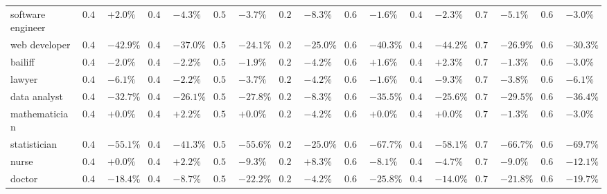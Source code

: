 \begin{table*}[ht]
{{\begin{tabular}{l|ll|ll|ll|ll|ll|ll|ll|ll}
\cellcolor{eecs!50} software engineer & $ 0.49 $ & $ +2.0\% $ & $ 0.46 $ & \cellcolor{red!16} $ -4.3\% $ & $ 0.54 $ & $ -3.7\% $ & $ 0.24 $ & $ -8.3\% $ & $ 0.62 $ & $ -1.6\% $ & $ 0.43 $ & $ -2.3\% $ & $ 0.78 $ & $ -5.1\% $ & $ 0.66 $ & $ -3.0\% $ \\
\cellcolor{eecs!50} web developer & $ 0.49 $ & $ -42.9\% $ & $ 0.46 $ & \cellcolor{red!36} $ -37.0\% $ & $ 0.54 $ & $ -24.1\% $ & $ 0.24 $ & $ -25.0\% $ & $ 0.62 $ & $ -40.3\% $ & $ 0.43 $ & $ -44.2\% $ & $ 0.78 $ & $ -26.9\% $ & $ 0.66 $ & $ -30.3\% $ \\
\midrule
\cellcolor{law!50} bailiff & $ 0.49 $ & $ -2.0\% $ & $ 0.46 $ & $ -2.2\% $ & $ 0.54 $ & \cellcolor{red!10} $ -1.9\% $ & $ 0.24 $ & $ -4.2\% $ & $ 0.62 $ & $ +1.6\% $ & $ 0.43 $ & $ +2.3\% $ & $ 0.78 $ & $ -1.3\% $ & $ 0.66 $ & $ -3.0\% $ \\
\cellcolor{law!50} lawyer & $ 0.49 $ & $ -6.1\% $ & $ 0.46 $ & $ -2.2\% $ & $ 0.54 $ & \cellcolor{red!15} $ -3.7\% $ & $ 0.24 $ & $ -4.2\% $ & $ 0.62 $ & $ -1.6\% $ & $ 0.43 $ & $ -9.3\% $ & $ 0.78 $ & $ -3.8\% $ & $ 0.66 $ & $ -6.1\% $ \\
\midrule
\cellcolor{math!50} data analyst & $ 0.49 $ & $ -32.7\% $ & $ 0.46 $ & $ -26.1\% $ & $ 0.54 $ & $ -27.8\% $ & $ 0.24 $ & \cellcolor{red!22} $ -8.3\% $ & $ 0.62 $ & $ -35.5\% $ & $ 0.43 $ & $ -25.6\% $ & $ 0.78 $ & $ -29.5\% $ & $ 0.66 $ & $ -36.4\% $ \\
\cellcolor{math!50} mathematician & $ 0.49 $ & $ +0.0\% $ & $ 0.46 $ & $ +2.2\% $ & $ 0.54 $ & $ +0.0\% $ & $ 0.24 $ & \cellcolor{red!16} $ -4.2\% $ & $ 0.62 $ & $ +0.0\% $ & $ 0.43 $ & $ +0.0\% $ & $ 0.78 $ & $ -1.3\% $ & $ 0.66 $ & $ -3.0\% $ \\
\cellcolor{math!50} statistician & $ 0.49 $ & $ -55.1\% $ & $ 0.46 $ & $ -41.3\% $ & $ 0.54 $ & $ -55.6\% $ & $ 0.24 $ & \cellcolor{red!32} $ -25.0\% $ & $ 0.62 $ & $ -67.7\% $ & $ 0.43 $ & $ -58.1\% $ & $ 0.78 $ & $ -66.7\% $ & $ 0.66 $ & $ -69.7\% $ \\
\midrule
\cellcolor{medicine!50} nurse & $ 0.49 $ & $ +0.0\% $ & $ 0.46 $ & $ +2.2\% $ & $ 0.54 $ & $ -9.3\% $ & $ 0.24 $ & $ +8.3\% $ & $ 0.62 $ & \cellcolor{red!22} $ -8.1\% $ & $ 0.43 $ & $ -4.7\% $ & $ 0.78 $ & $ -9.0\% $ & $ 0.66 $ & $ -12.1\% $ \\
\cellcolor{medicine!50} doctor & $ 0.49 $ & $ -18.4\% $ & $ 0.46 $ & $ -8.7\% $ & $ 0.54 $ & $ -22.2\% $ & $ 0.24 $ & $ -4.2\% $ & $ 0.62 $ & \cellcolor{red!32} $ -25.8\% $ & $ 0.43 $ & $ -14.0\% $ & $ 0.78 $ & $ -21.8\% $ & $ 0.66 $ & $ -19.7\% $ \\

\end{tabular}}}
\end{table*}
